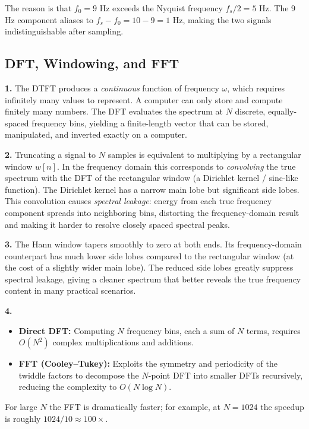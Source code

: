 \documentclass[11pt,a4paper]{article}
\begin{document}
The reason is that $f_0 = 9$ Hz exceeds the Nyquist frequency $f_s/2 = 5$ Hz.  The 9\,Hz component aliases to $f_s - f_0 = 10 - 9 = 1$ Hz, making the two signals indistinguishable after sampling.

\subsection{DFT, Windowing, and FFT}

\textbf{1.} The DTFT produces a \emph{continuous} function of frequency $\omega$, which requires infinitely many values to represent.  A computer can only store and compute finitely many numbers.  The DFT evaluates the spectrum at $N$ discrete, equally-spaced frequency bins, yielding a finite-length vector that can be stored, manipulated, and inverted exactly on a computer.

\medskip
\textbf{2.} Truncating a signal to $N$ samples is equivalent to multiplying by a rectangular window $w[n]$.  In the frequency domain this corresponds to \emph{convolving} the true spectrum with the DFT of the rectangular window (a Dirichlet kernel / sinc-like function).  The Dirichlet kernel has a narrow main lobe but significant side lobes.  This convolution causes \emph{spectral leakage}: energy from each true frequency component spreads into neighboring bins, distorting the frequency-domain result and making it harder to resolve closely spaced spectral peaks.

\medskip
\textbf{3.} The Hann window tapers smoothly to zero at both ends.  Its frequency-domain counterpart has much lower side lobes compared to the rectangular window (at the cost of a slightly wider main lobe).  The reduced side lobes greatly suppress spectral leakage, giving a cleaner spectrum that better reveals the true frequency content in many practical scenarios.

\medskip
\textbf{4.} \begin{itemize}[nosep]
  \item \textbf{Direct DFT:} Computing $N$ frequency bins, each a sum of $N$ terms, requires $O(N^2)$ complex multiplications and additions.
  \item \textbf{FFT (Cooley--Tukey):} Exploits the symmetry and periodicity of the twiddle factors to decompose the $N$-point DFT into smaller DFTs recursively, reducing the complexity to $O(N \log N)$.
\end{itemize}
For large $N$ the FFT is dramatically faster; for example, at $N=1024$ the speedup is roughly $1024/10 \approx 100\times$.
\end{document}
